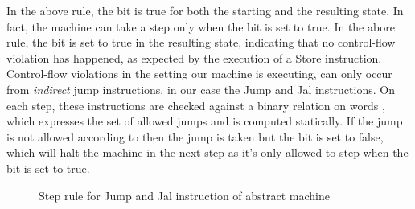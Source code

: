 In the above rule, the \ok bit is true for both the starting and the
resulting state. In fact, the machine can take a step only when the \ok
bit is set to true. In the abore rule, the \ok bit is set to true in the
resulting state, indicating that no control-flow violation has happened, as
expected by the execution of a Store instruction. Control-flow violations in the
\NWC setting our machine is executing, can only occur from \emph{indirect} jump
instructions, in our case the Jump and Jal instructions. On each step, these
instructions are checked against a binary relation on words \J, which expresses
the set of allowed jumps and is computed statically. If the jump is not allowed
according to \J then the jump is taken but the \ok bit is set to false, which
will halt the machine in the next step as it's only allowed to step when the
\ok bit is set to true.

\begin{figure}[!htpb]
\bigskip

\caption{Step rule for Jump and Jal instruction of abstract machine}
\end{figure}



